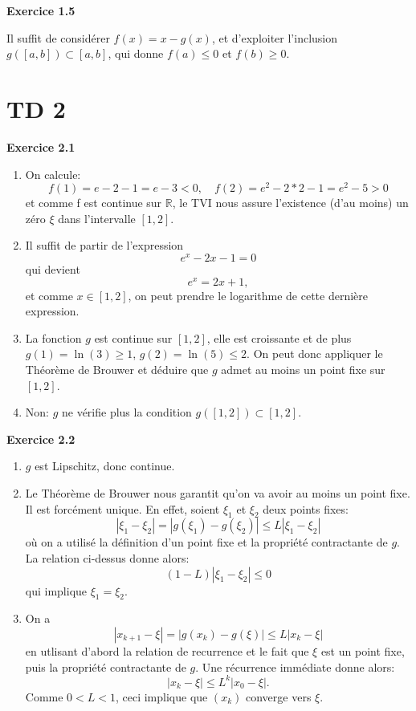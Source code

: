 \documentclass{article}
\begin{document}
{\bf Exercice 1.5}

Il suffit de considérer $f(x) = x - g(x)$, et d'exploiter l'inclusion $g([a,b]) \subset [a,b]$, qui donne $f(a) \leq 0$ et $f(b) \geq 0$.

\newpage

\section{TD 2}

{\bf Exercice 2.1}

\begin{enumerate}
    \item On calcule:
    \[ f(1) = e - 2 - 1 = e - 3 < 0, \quad f(2) = e^2 - 2*2 - 1 = e^2 - 5 > 0 \]
    et comme f est continue sur $\mathbb{R}$, le TVI nous assure l'existence (d'au moins) un zéro $\xi$ dans l'intervalle $[1,2]$.
    
    \item Il suffit de partir de l'expression
    $$  e^x - 2x - 1 = 0$$ qui devient $$ e^x = 2 x + 1,$$ et comme $x\in[1,2]$, on peut prendre le logarithme de cette dernière expression.
    
    \item La fonction $g$ est continue sur $[1,2]$, elle est croissante et de plus $g(1) = \ln(3) \geq 1$, $g(2) = \ln(5)\leq2$. On peut donc appliquer le Théorème de Brouwer et déduire que $g$ admet au moins un point fixe sur $[1,2]$.
    
    \item Non: $g$ ne vérifie plus la condition $g([1,2]) \subset [1,2]$.
\end{enumerate}

{\bf Exercice 2.2}

\begin{enumerate}
    \item $g$ est Lipschitz, donc continue.
    \item Le Théorème de Brouwer nous garantit qu'on va avoir au moins un point fixe. Il est forcément unique. En effet, soient $\xi_1$ et $\xi_2$ deux points fixes:
    \[
    | \xi_1 - \xi_2 | = | g(\xi_1) - g(\xi_2) |
    \leq L | \xi_1 - \xi_2 |
    \]
    où on a utilisé la définition d'un point fixe et la propriété contractante de $g$. La relation ci-dessus donne alors:
    \[
    (1 - L) | \xi_1 - \xi_2 | \leq 0
    \]
    qui implique $\xi_1 = \xi_2$.
    \item On a 
    \[
    | x_{k+1} - \xi |
    = |g(x_k) - g(\xi) | \leq L | x_k - \xi |
    \]
    en utlisant d'abord la relation de recurrence et le fait que $\xi$ est un point fixe, puis la propriété contractante de $g$.
    Une récurrence immédiate donne alors:
    \[
    | x_k - \xi | \leq L^k | x_0 - \xi |.
    \]
    Comme $0 < L < 1$, ceci implique que $(x_k)$ converge vers $\xi$.
\end{enumerate}
\end{document}
